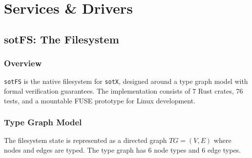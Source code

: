 \documentclass[11pt,a4paper,twoside]{report}
\theoremstyle{definition}
\newcommand{\sotX}{\texttt{sotX}}
\newcommand{\sotX}{\texttt{sotX}}
\newcommand{\sotFS}{\texttt{sotFS}}
\begin{document}
\part{Services \& Drivers}

\chapter{sotFS: The Filesystem}
\label{ch:sotfs}

\section{Overview}

\sotFS{} is the native filesystem for \sotX{}, designed around a type graph
model with formal verification guarantees. The implementation consists of 7
Rust crates, 76 tests, and a mountable FUSE prototype for Linux development.

\section{Type Graph Model}

The filesystem state is represented as a directed graph $TG = (V, E)$ where
nodes and edges are typed. The type graph has 6 node types and 6 edge types.
\end{document}
